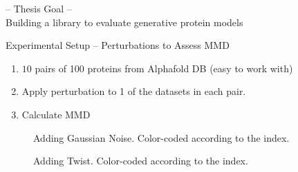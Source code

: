 \documentclass[aspectratio=169, 10pt, dvipsnames, handout]{beamer}
\begin{document}
\begin{frame}[standout]
  -- Thesis Goal -- \\
  Building a library to evaluate generative protein models
\end{frame}

{
  \begin{frame}[fragile]{Experimental Setup -- Perturbations to Assess MMD}
    \begin{enumerate}
      \item $10$ pairs of 100 proteins from Alphafold DB (easy to work
      with)
      \item Apply perturbation to 1 of the datasets in each pair.
      \item Calculate MMD
    \end{enumerate}

  \begin{minipage}{0.45\textwidth}
    \begin{figure}
      \centering
      \caption{Adding Gaussian Noise. Color-coded according to the index.}
      \label{fig:gaussian}
    \end{figure}
  \end{minipage}
  \hfill
  \begin{minipage}{0.45\textwidth}
    \begin{figure}
      \centering
      \caption{Adding Twist. Color-coded according to the index.}
      \label{fig:twist}
    \end{figure}
  \end{minipage}
\end{frame}
}
\end{document}
